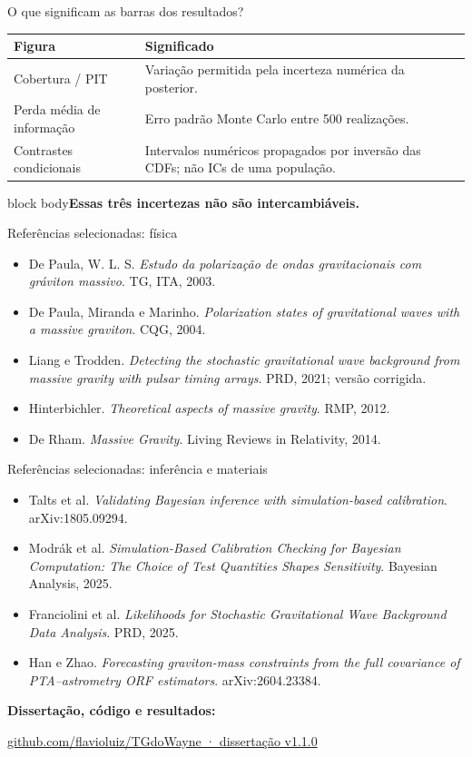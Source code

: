 \documentclass[aspectratio=169,11pt]{beamer}
\newcommand{\take}[1]{\par\vspace{2mm}\begin{beamercolorbox}[wd=\linewidth,sep=2.5mm]{block body}\small\textbf{#1}\end{beamercolorbox}}
\begin{document}
\begin{frame}{O que significam as barras dos resultados?}
\small\renewcommand{\arraystretch}{1.8}\begin{tabular}{>{\raggedright\arraybackslash}p{4cm}>{\raggedright\arraybackslash}p{8.5cm}}\toprule Figura & Significado\\\midrule Cobertura / PIT & Variação permitida pela incerteza numérica da posterior.\\ Perda média de informação & Erro padrão Monte Carlo entre 500 realizações.\\ Contrastes condicionais & Intervalos numéricos propagados por inversão das CDFs; não ICs de uma população.\\\bottomrule\end{tabular}
\take{Essas três incertezas não são intercambiáveis.}
\end{frame}
\begin{frame}{Referências selecionadas: física}
\small\begin{itemize}\setlength\itemsep{3mm}
\item De Paula, W. L. S. \textit{Estudo da polarização de ondas gravitacionais com gráviton massivo}. TG, ITA, 2003.
\item De Paula, Miranda e Marinho. \textit{Polarization states of gravitational waves with a massive graviton}. CQG, 2004.
\item Liang e Trodden. \textit{Detecting the stochastic gravitational wave background from massive gravity with pulsar timing arrays}. PRD, 2021; versão corrigida.
\item Hinterbichler. \textit{Theoretical aspects of massive gravity}. RMP, 2012.
\item De Rham. \textit{Massive Gravity}. Living Reviews in Relativity, 2014.
\end{itemize}
\end{frame}
\begin{frame}{Referências selecionadas: inferência e materiais}
\small\begin{itemize}\setlength\itemsep{3mm}
\item Talts et al. \textit{Validating Bayesian inference with simulation-based calibration}. arXiv:1805.09294.
\item Modrák et al. \textit{Simulation-Based Calibration Checking for Bayesian Computation: The Choice of Test Quantities Shapes Sensitivity}. Bayesian Analysis, 2025.
\item Franciolini et al. \textit{Likelihoods for Stochastic Gravitational Wave Background Data Analysis}. PRD, 2025.
\item Han e Zhao. \textit{Forecasting graviton-mass constraints from the full covariance of PTA--astrometry ORF estimators}. arXiv:2604.23384.
\end{itemize}\vspace{3mm}\textbf{Dissertação, código e resultados:}\par\href{https://github.com/flavioluiz/TGdoWayne/releases/tag/v1.1.0}{github.com/flavioluiz/TGdoWayne · dissertação v1.1.0}
\end{frame}
\end{document}
